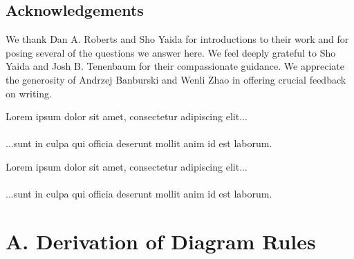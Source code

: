 \documentclass{article}
\newcommand{\lorem}[1]{
    Lorem ipsum dolor sit amet, consectetur adipiscing elit...\\
    \nopagebreak\vspace{#1cm} \ \\
    ...sunt in culpa qui officia deserunt mollit anim id est laborum.
}
\begin{document}

\subsection{Acknowledgements}
    We thank Dan A. Roberts and Sho Yaida for introductions to their work and
    for posing several of the questions we answer here.  We feel deeply
    grateful to Sho Yaida and Josh B. Tenenbaum for their compassionate
    guidance.  We appreciate the generosity of
        Andrzej Banburski
        and
        Wenli Zhao
    in offering crucial feedback on writing.


    
    

    \lorem{3}
    \lorem{3}


\section*{A. Derivation of Diagram Rules}
\end{document}
